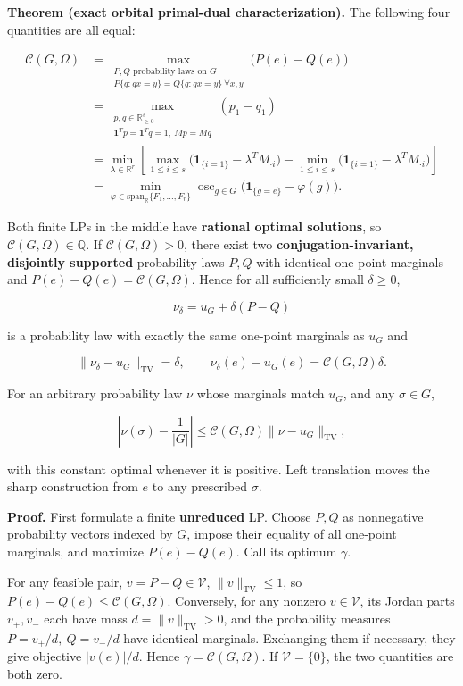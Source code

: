 \documentclass[11pt]{article}
\begin{document}
\textbf{Theorem (exact orbital primal-dual characterization).} The
following four quantities are all equal:

\[
\begin{aligned}
\mathcal C(G,\Omega)
&=\max_{\substack{P,Q\text{ probability laws on }G\\
P\{g:gx=y\}=Q\{g:gx=y\}\ \forall x,y}}
\big(P(e)-Q(e)\big)\\
&=\max_{\substack{p,q\in\mathbb R_{\ge0}^{s}\\
\mathbf1^Tp=\mathbf1^Tq=1,\ Mp=Mq}}
(p_1-q_1)\\
&=\min_{\lambda\in\mathbb R^r}
\left[
\max_{1\le i\le s}\big(\mathbf1_{\{i=1\}}-\lambda^TM_{\cdot i}\big)
-\min_{1\le i\le s}\big(\mathbf1_{\{i=1\}}-\lambda^TM_{\cdot i}\big)
\right]\\
&=\min_{\varphi\in\mathrm{span}_{\mathbb R}\{F_1,\ldots,F_r\}}
\operatorname{osc}_{g\in G}\big(\mathbf1_{\{g=e\}}-\varphi(g)\big).
\end{aligned}
\tag{5}
\]

Both finite LPs in the middle have \textbf{rational optimal solutions},
so \(\mathcal C(G,\Omega)\in\mathbb Q\). If \(\mathcal C(G,\Omega)>0\),
there exist two \textbf{conjugation-invariant, disjointly supported}
probability laws \(P,Q\) with identical one-point marginals and
\(P(e)-Q(e)=\mathcal C(G,\Omega)\). Hence for all sufficiently small
\(\delta\ge0\),

\[
\nu_\delta=u_G+\delta(P-Q) \tag{6}
\]

is a probability law with exactly the same one-point marginals as
\(u_G\) and

\[
\|\nu_\delta-u_G\|_{\mathrm{TV}}=\delta,\qquad
\nu_\delta(e)-u_G(e)=\mathcal C(G,\Omega)\delta. \tag{7}
\]

For an arbitrary probability law \(\nu\) whose marginals match \(u_G\),
and any \(\sigma\in G\),

\[
\left|\nu(\sigma)-\frac1{|G|}\right|
\le\mathcal C(G,\Omega)\|\nu-u_G\|_{\mathrm{TV}}, \tag{8}
\]

with this constant optimal whenever it is positive. Left translation
moves the sharp construction from \(e\) to any prescribed \(\sigma\).

\textbf{Proof.} First formulate a finite \textbf{unreduced} LP. Choose
\(P,Q\) as nonnegative probability vectors indexed by \(G\), impose
their equality of all one-point marginals, and maximize \(P(e)-Q(e)\).
Call its optimum \(\gamma\).

For any feasible pair, \(v=P-Q\in\mathcal V\),
\(\|v\|_{\mathrm{TV}}\le1\), so \(P(e)-Q(e)\le\mathcal C(G,\Omega)\).
Conversely, for any nonzero \(v\in\mathcal V\), its Jordan parts
\(v_+,v_-\) each have mass \(d=\|v\|_{\mathrm{TV}}>0\), and the
probability measures \(P=v_+/d,\ Q=v_-/d\) have identical marginals.
Exchanging them if necessary, they give objective \(|v(e)|/d\). Hence
\(\gamma=\mathcal C(G,\Omega)\). If \(\mathcal V=\{0\}\), the two
quantities are both zero.
\end{document}
